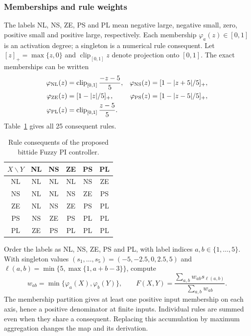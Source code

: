 \subsubsection{Memberships and rule weights}
The labels NL, NS, ZE, PS and PL mean negative large, negative small, zero, positive small and positive large, respectively. Each membership $\varphi_a(z)\in[0,1]$ is an activation degree; a singleton is a numerical rule consequent. Let $[z]_+=\max\{z,0\}$ and $\operatorname{clip}_{[0,1]}z$
denote projection onto $[0,1]$. The exact memberships can be written
\begin{align}
 \varphi_{\rm NL}(z)&=\operatorname{clip}_{[0,1]}\frac{-z-5}{5},&
 \varphi_{\rm NS}(z)&=[1-|z+5|/5]_+,\nonumber\\
 \varphi_{\rm ZE}(z)&=[1-|z|/5]_+,&
 \varphi_{\rm PS}(z)&=[1-|z-5|/5]_+,\nonumber\\
 \varphi_{\rm PL}(z)&=\operatorname{clip}_{[0,1]}\frac{z-5}{5}.
 \label{detail:eq:fpi_full_memberships}
\end{align}
Table~\ref{detail:tab:fpi_full_rules} gives all 25 consequent rules.
\begin{table}[t]
\caption{Rule consequents of the proposed bittide Fuzzy PI controller.}
\label{detail:tab:fpi_full_rules}
\centering
\begin{tabular}{@{}c|ccccc@{}}
\toprule
$X\backslash Y$ & NL & NS & ZE & PS & PL\\
\midrule
NL & NL & NL & NL & NS & ZE\\
NS & NL & NL & NS & ZE & PS\\
ZE & NL & NS & ZE & PS & PL\\
PS & NS & ZE & PS & PL & PL\\
PL & ZE & PS & PL & PL & PL\\
\bottomrule
\end{tabular}
\end{table}
Order the labels as NL, NS, ZE, PS and PL, with label indices
$a,b\in\{1,\ldots,5\}$. With singleton values
$(s_1,\ldots,s_5)=(-5,-2.5,0,2.5,5)$ and
$\ell(a,b)=\min\{5,\max\{1,a+b-3\}\}$, compute
\begin{equation}
 w_{ab}=\min\{\varphi_a(X),\varphi_b(Y)\},\qquad
 F(X,Y)=\frac{\sum_{a,b}w_{ab}s_{\ell(a,b)}}{\sum_{a,b}w_{ab}}.
 \label{detail:eq:fpi_rules}
\end{equation}
The membership partition gives at least one positive input membership on
each axis, hence a positive denominator at finite inputs. Individual rules
are summed even when they share a consequent. Replacing this accumulation
by maximum aggregation changes the map and its derivation.

